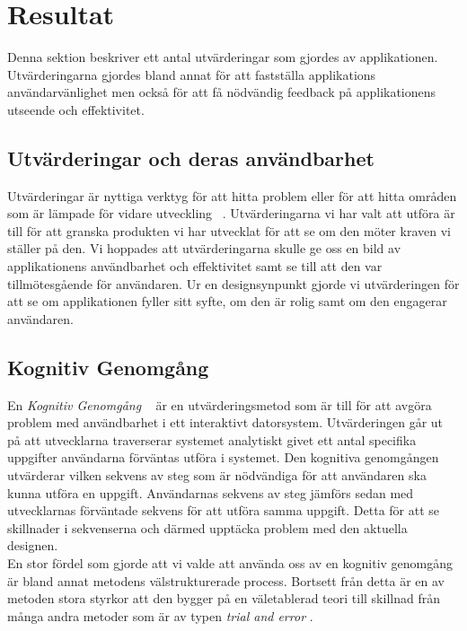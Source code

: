 \documentclass[a4paper, 11pt]{article}
\begin{document}
\section{Resultat}
Denna sektion beskriver ett antal utvärderingar som gjordes av applikationen. Utvärderingarna gjordes bland annat för att fastställa applikations användarvänlighet men också för att få nödvändig feedback på applikationens utseende och effektivitet.  

\subsection{Utvärderingar och deras användbarhet}
Utvärderingar är nyttiga verktyg för att hitta problem eller för att hitta områden som är lämpade för vidare utveckling ~\cite[sid 226--228]{benyon2010designing}. Utvärderingarna vi har valt att utföra är till för att granska produkten vi har utvecklat för att se om den möter kraven vi ställer på den. Vi hoppades att utvärderingarna skulle ge oss en bild av applikationens användbarhet och effektivitet samt se till att den var tillmötesgående för användaren. Ur en designsynpunkt gjorde vi utvärderingen för att se om applikationen fyller sitt syfte, om den är rolig samt om den engagerar användaren.

\subsection{Kognitiv Genomgång}
En \textit{Kognitiv Genomgång} ~\cite[sid 2--8]{cognitive} är en utvärderingsmetod som är till för att avgöra problem med användbarhet i ett interaktivt datorsystem. Utvärderingen går ut på att utvecklarna traverserar systemet analytiskt givet ett antal specifika uppgifter användarna förväntas utföra i systemet. Den kognitiva genomgången utvärderar vilken sekvens av steg som är nödvändiga för att användaren ska kunna utföra en uppgift. Användarnas sekvens av steg jämförs sedan med utvecklarnas förväntade sekvens för att utföra samma uppgift. Detta för att se skillnader i sekvenserna och därmed upptäcka problem med den aktuella designen.\\
En stor fördel som gjorde att vi valde att använda oss av en kognitiv genomgång är bland annat metodens välstrukturerade process. Bortsett från detta är en av metoden stora styrkor att den bygger på en väletablerad teori till skillnad från många andra metoder som är av typen \textit{trial and error} \cite{} .\\
\end{document}

